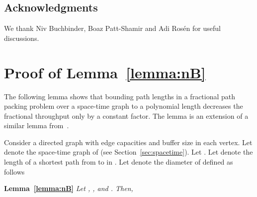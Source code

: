 \documentclass[11pt]{article}
\newenvironment{proof sketch}[1]{\noindent {\emph{Proof sketch of #1:}}}{\hfill \qed}
\begin{document}
\subsection*{Acknowledgments}
We thank  Niv Buchbinder, Boaz Patt-Shamir and Adi Ros{\'e}n for useful discussions.







\appendix

\section{Proof of Lemma~\ref{lemma:nB}}\label{sec:proofnB}

The following lemma shows that bounding path lengths in a fractional
path packing problem over a space-time graph to a polynomial
length decreases the fractional throughput only by a constant factor.  The
lemma is an extension of a similar lemma from~\cite{AZ}.

Consider a directed graph  with edge capacities  and
buffer size  in each vertex.  Let  denote the space-time
graph of  (see Section~\ref{sec:spacetime}).  Let .  Let
 denote the length of a shortest path from  to  in
. Let  denote the diameter of  defined as follows


\textbf{Lemma~\ref{lemma:nB}} \emph{Let , , and .  Then, }
\end{document}
